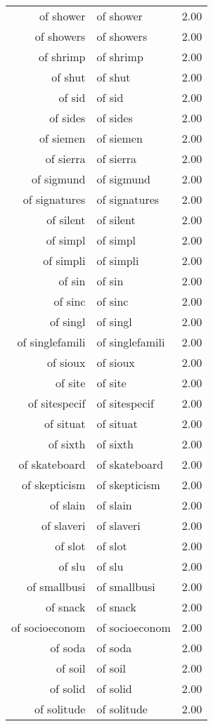 \begin{table}[ht]
\begin{tabular}{rlr}
  of shower & of shower & 2.00 \\ 
  of showers & of showers & 2.00 \\ 
  of shrimp & of shrimp & 2.00 \\ 
  of shut & of shut & 2.00 \\ 
  of sid & of sid & 2.00 \\ 
  of sides & of sides & 2.00 \\ 
  of siemen & of siemen & 2.00 \\ 
  of sierra & of sierra & 2.00 \\ 
  of sigmund & of sigmund & 2.00 \\ 
  of signatures & of signatures & 2.00 \\ 
  of silent & of silent & 2.00 \\ 
  of simpl & of simpl & 2.00 \\ 
  of simpli & of simpli & 2.00 \\ 
  of sin & of sin & 2.00 \\ 
  of sinc & of sinc & 2.00 \\ 
  of singl & of singl & 2.00 \\ 
  of singlefamili & of singlefamili & 2.00 \\ 
  of sioux & of sioux & 2.00 \\ 
  of site & of site & 2.00 \\ 
  of sitespecif & of sitespecif & 2.00 \\ 
  of situat & of situat & 2.00 \\ 
  of sixth & of sixth & 2.00 \\ 
  of skateboard & of skateboard & 2.00 \\ 
  of skepticism & of skepticism & 2.00 \\ 
  of slain & of slain & 2.00 \\ 
  of slaveri & of slaveri & 2.00 \\ 
  of slot & of slot & 2.00 \\ 
  of slu & of slu & 2.00 \\ 
  of smallbusi & of smallbusi & 2.00 \\ 
  of snack & of snack & 2.00 \\ 
  of socioeconom & of socioeconom & 2.00 \\ 
  of soda & of soda & 2.00 \\ 
  of soil & of soil & 2.00 \\ 
  of solid & of solid & 2.00 \\ 
  of solitude & of solitude & 2.00 \\ 

\end{tabular}
\end{table}
